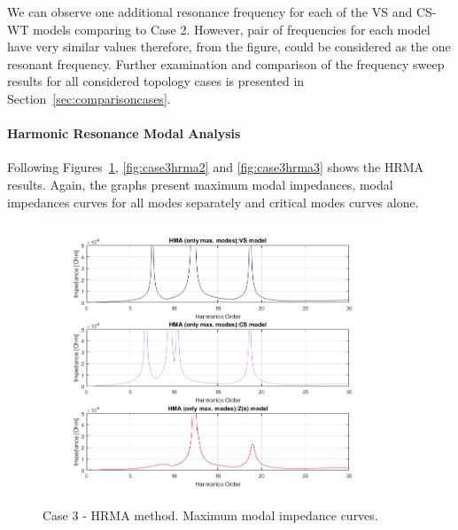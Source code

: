 \documentclass[12pt]{report} %
\begin{document}
We can observe one additional resonance frequency for each of the VS and CS-WT models comparing to Case 2. However, pair of frequencies for each model have very similar values therefore, from the figure, could be considered as the one resonant frequency. Further examination and comparison of the frequency sweep results for all considered topology cases is presented in Section~\ref{sec:comparisoncases}.

\paragraph{Harmonic Resonance Modal Analysis}
Following Figures~\ref{fig:case3hrma1}, \ref{fig:case3hrma2} and \ref{fig:case3hrma3} shows the HRMA results. Again, the graphs present maximum modal impedances, modal impedances curves for all modes separately and critical modes curves alone.

\begin{figure}[htb]
	\centering
	\includegraphics[width=0.9\textwidth]{img/Case3/Case3_HMA_max.png}
  	\caption{Case 3 - HRMA method. Maximum modal impedance curves.}
  	\label{fig:case3hrma1}
\end{figure}
\FloatBarrier
\end{document}

